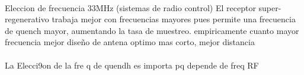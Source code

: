 \paragraph{} Eleccion de frecuencia 33MHz (sistemas de radio control) El receptor super-regenerativo trabaja mejor con frecuencias mayores pues permite una frecuencia de quench mayor, aumentando la tasa de muestreo. empiricamente cuanto mayor frecuencia mejor diseño de antena optimo mas corto, mejor distancia
\paragraph{}
La Elecci9on de la fre q de quendh  es importa pq depende de freq RF 
